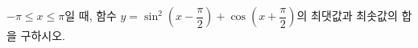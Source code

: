 $-\pi\le x\le\pi$일 때, 함수 $y=\sin^2\left(x-\dfrac{\pi}{2}\right)+\cos\left(x+\dfrac{\pi}{2}\right)$의 최댓값과 최솟값의 합을 구하시오.
